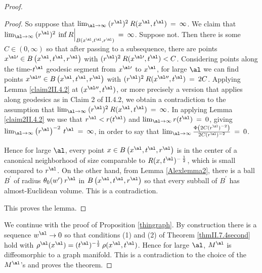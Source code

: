 \begin{proof}
\begin{proof}
So suppose that $\lim_{\al \rightarrow \infty} \:
(r^\al)^{2} \: R(x^\al, t^\al) \: = \: \infty$.
We claim that $\lim_{\al \rightarrow \infty} \:
(r^\al)^{2} \: \inf R \Big|_{B \left( x^\al, t^\al,
r^\al \right)} \: = \: \infty$.
Suppose not.  Then there is some $C \in (0, \infty)$ so that
after passing to a subsequence, there are points
$x^{\al \prime} \in B \left( x^\al, t^\al, r^\al
 \right)$ with
$(r^\al)^{2} \: R(x^{\al \prime}, t^\al) < C$. Considering points
along the time-$t^\al$ geodesic segment from
$x^{\al \prime}$ to $x^\al$,
for large $\al$ we can find points
$x^{\al \prime \prime} \in B \left( x^\al, t^\al,
r^\al \right)$ with
$(r^\al)^{2} \: R(x^{\al \prime\prime}, t^\al) \: = \: 2C$.
Applying Lemma \ref{claim2II.4.2} at $(x^{\al \prime \prime}, t^\al)$,
or more precisely a version that applies along geodesics as in
Claim 2 of II.4.2, we obtain a contradiction to the assumption
that $\lim_{\al \rightarrow \infty} \:
(r^\al)^{2} \: R(x^\al, t^\al) \: = \: \infty$. In applying
Lemma \ref{claim2II.4.2} we use that
$r^\al < r(t^\al)$ and $\lim_{\al \rightarrow \infty} r(t^\al) \: = \: 0$,
giving
$\lim_{\al \rightarrow \infty} \left( r^\al \right)^{-2} \: t^\al \: = \:
\infty$, in order to say that
$\lim_{\al \rightarrow \infty}
\frac{\Phi \left( 2C (r^\al)^{-2} \right)}{ 2C (r^\al)^{-2}} \: = \: 0$.

Hence for large $\al$, every point $x \in B \left( x^\al, t^\al,
r^\al \right)$ is in the
center of a canonical neighborhood of size comparable to
$R(x, t^\al)^{- \: \frac12}$, which is small compared to $r^\al$.
On the other hand,
from Lemma \ref{Alexlemma2},
there is a ball $B^\prime$ of radius $\theta_0(w^{\prime}) \:
r^\al$ in
$B \left( x^\al, t^\al, r^\al \right)$ so that every subball of $B^\prime$ has
almost-Euclidean volume. This is a contradiction.

This proves the lemma.
\end{proof}

We continue with the proof of Proposition \ref{thingraph}.
By construction there is a sequence $w^\al \rightarrow 0$ so that
conditions (1) and (2) of Theorem \ref{thmII.7.4second} hold
with $\rho^\al(x^\al) = (t^\al)^{- \frac12} \: \rho(x^\al, t^\al)$.
Hence for large $\al$, $M^\al$ is
diffeomorphic to a graph manifold.  This is a contradiction to the choice of
the $M^\al$'s and proves the theorem.


\end{proof}
